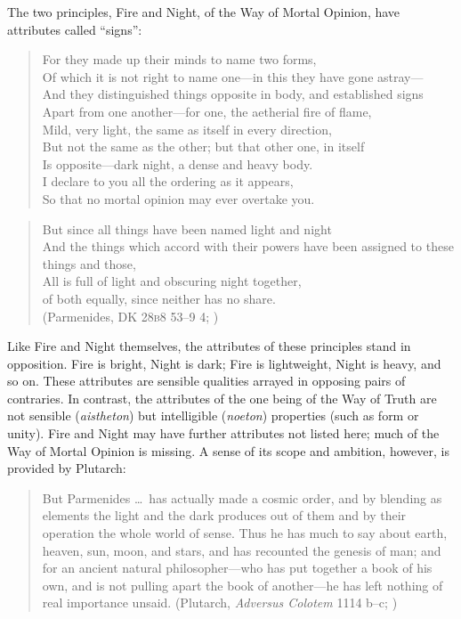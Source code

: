 The two principles, Fire and Night, of the Way of Mortal Opinion, have attributes called ``signs'':
\begin{verse}
    For they made up their minds to name two forms,\\ 
    Of which it is not right to name one---in this they have gone astray---\\
    And they distinguished things opposite in body, and established signs\\
    Apart from one another---for one, the aetherial fire of flame,\\
    Mild, very light, the same as itself in every direction,\\
    But not the same as the other; but that other one, in itself\\
    Is opposite---dark night, a dense and heavy body.\\
    I declare to you all the ordering as it appears,\\
    So that no mortal opinion may ever overtake you.
\end{verse}
\begin{verse}
    But since all things have been named light and night\\
    And the things which accord with their powers have been assigned to these things and those,\\
    All is full of light and obscuring night together,\\
    of both equally, since neither has no share.\\
    (Parmenides, DK 28\textsc{b}8 53--9 4; \citealt[155]{McKirahan:1994ve})
\end{verse}
Like Fire and Night themselves, the attributes of these principles stand in opposition. Fire is bright, Night is dark; Fire is lightweight, Night is heavy, and so on. These attributes are sensible qualities arrayed in opposing pairs of contraries. In contrast, the attributes of the one being of the Way of Truth are not sensible (\emph{aistheton}) but intelligible (\emph{noeton}) properties (such as form or unity).  Fire and Night may have further attributes not listed here; much of the Way of Mortal Opinion is missing. A sense of its scope and ambition, however, is provided by Plutarch:
\begin{quote}
    But Parmenides \ldots\ has actually made a cosmic order, and by blending as elements the light and the dark produces out of them and by their operation the whole world of sense. Thus he has much to say about earth, heaven, sun, moon, and stars, and has recounted the genesis of man; and for an ancient natural philosopher---who has put together a book of his own, and is not pulling apart the book of another---he has left nothing of real importance unsaid. (Plutarch, \emph{Adversus Colotem} 1114 b--c; \citealt[231]{Einarson:1967zr})
\end{quote}

